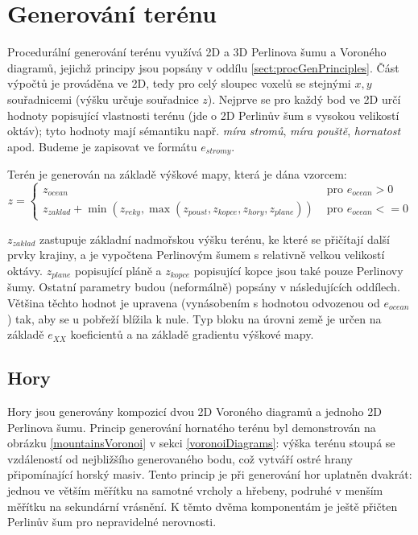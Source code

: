 \section{Generování terénu}
Procedurální generování terénu využívá 2D a 3D Perlinova šumu a Voroného diagramů, jejichž principy jsou popsány v oddílu \ref{sect:procGenPrinciples}. Část výpočtů je prováděna ve 2D, tedy pro celý sloupec voxelů se stejnými $x, y$ souřadnicemi (výšku určuje souřadnice $z$). Nejprve se pro každý bod ve 2D určí hodnoty popisující vlastnosti terénu (jde o 2D Perlinův šum s vysokou velikostí oktáv);	tyto hodnoty mají sémantiku např. \textit{míra stromů}, \textit{míra pouště}, \textit{hornatost} apod. Budeme je zapisovat ve formátu $e_{stromy}$.

Terén je generován na základě výškové mapy, která je dána vzorcem:
\begin{equation}
	z = \left\{ \begin{aligned}
		z_{ocean} & \text{ pro $e_{ocean} > 0$} \\
		z_{zaklad} + \min(z_{reky}, \max(z_{poust}, z_{kopce}, z_{hory}, z_{plane})) & \text{ pro $e_{ocean} <= 0$}
	\end{aligned}
	\right.
\end{equation}

$z_{zaklad}$ zastupuje základní nadmořskou výšku terénu, ke které se přičítají další prvky krajiny, a je vypočtena Perlinovým šumem s relativně velkou velikostí oktávy. $z_{plane}$ popisující pláně a $z_{kopce}$ popisující kopce jsou také pouze Perlinovy šumy. Ostatní parametry budou (neformálně) popsány v následujících oddílech. Většina těchto hodnot je upravena (vynásobením s hodnotou odvozenou od $e_{ocean}$) tak, aby se u pobřeží blížila k nule. Typ bloku na úrovni země je určen na základě $e_{XX}$ koeficientů a na základě gradientu výškové mapy.

\subsection{Hory}
Hory jsou generovány kompozicí dvou 2D Voroného diagramů a jednoho 2D Perlinova šumu. Princip generování hornatého terénu byl demonstrován na obrázku \ref{mountainsVoronoi} v sekci \ref{voronoiDiagrams}: výška terénu stoupá se vzdáleností od nejbližšího generovaného bodu, což vytváří ostré hrany připomínající horský masiv. Tento princip je při generování hor uplatněn dvakrát: jednou ve větším měřítku na samotné vrcholy a hřebeny, podruhé v menším měřítku na sekundární vrásnění. K těmto dvěma komponentám je ještě přičten Perlinův šum pro nepravidelné nerovnosti.

